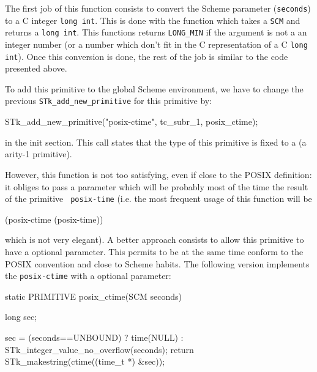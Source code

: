 \documentclass[10pt]{article}
\begin{document}
The first job of this function consists to convert the Scheme
parameter ({\tt seconds}) to a C integer {\tt long int}. This is done with the
function which takes a {\tt SCM}
and returns a {\tt long int}. This functions returns {\tt LONG\_MIN} if
the argument is not a an integer number (or a number which don't fit in the C
representation of a C {\tt long int}). Once this conversion is done,
the rest of the job is similar to the code presented above.

To add this primitive to the global Scheme environment, we have to
change the previous {\tt STk\_add\_new\_primitive} for this primitive by:

\begin{Code}
\begin{listing}[200]{2}
STk_add_new_primitive("posix-ctime", tc_subr_1, posix_ctime);
\end{listing}
\end{Code}

in the init section. This call states that the type of this primitive
is fixed to a  (a arity-1 primitive).

However, this function is not too satisfying, even if close to the
POSIX definition: it obliges to pass a parameter which will be
probably most of the time the result of the primitive {\tt
posix-time} (i.e. the most frequent usage of this function will be

\begin{Code}
\begin{listing}[200]{2}
(posix-ctime (posix-time))
\end{listing}
\end{Code}

which is not very elegant). A better approach consists to allow this
primitive to have a optional parameter. This permits to be at the
same time conform to the POSIX convention and close to Scheme habits. 
The following version implements the {\tt posix-ctime} with a optional
parameter:
\begin{Code}
\begin{listing}[200]{2}
static PRIMITIVE posix_ctime(SCM seconds)
{
  long sec;

  sec = (seconds==UNBOUND) ? time(NULL)
                           : STk_integer_value_no_overflow(seconds);
  return STk_makestring(ctime((time_t *) &sec));
}
\end{listing}
\end{Code}
\end{document}
